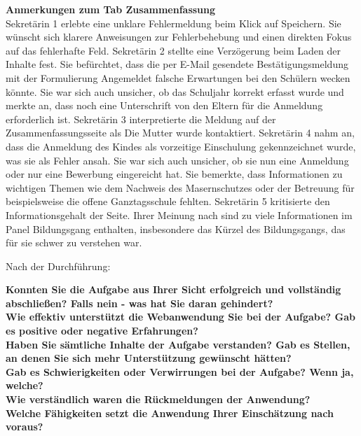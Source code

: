 \textbf{Anmerkungen zum Tab \glqq Zusammenfassung\grqq{}}\\
Sekretärin 1 erlebte eine unklare Fehlermeldung beim Klick auf \glqq Speichern\grqq{}. Sie wünscht sich klarere Anweisungen zur Fehlerbehebung und einen direkten Fokus auf das fehlerhafte Feld.
Sekretärin 2 stellte eine Verzögerung beim Laden der Inhalte fest. Sie befürchtet, dass die per E-Mail gesendete Bestätigungsmeldung mit der Formulierung \glqq Angemeldet\grqq{} falsche Erwartungen bei den Schülern wecken könnte. Sie war sich auch unsicher, ob das Schuljahr korrekt erfasst wurde und merkte an, dass noch eine Unterschrift von den Eltern für die Anmeldung erforderlich ist.
Sekretärin 3 interpretierte die Meldung auf der Zusammenfassungsseite als \glqq Die Mutter wurde kontaktiert\grqq{}.
Sekretärin 4 nahm an, dass die Anmeldung des Kindes als \glqq vorzeitige Einschulung\grqq{} gekennzeichnet wurde, was sie als Fehler ansah. Sie war sich auch unsicher, ob sie nun eine \glqq Anmeldung\grqq{} oder nur eine \glqq Bewerbung\grqq{} eingereicht hat. Sie bemerkte, dass Informationen zu wichtigen Themen wie dem Nachweis des Masernschutzes oder der Betreuung für beispielsweise die offene Ganztagsschule fehlten.
Sekretärin 5 kritisierte den Informationsgehalt der Seite. Ihrer Meinung nach sind zu viele Informationen im Panel \glqq Bildungsgang\grqq{} enthalten, insbesondere das Kürzel des Bildungsgangs, das für sie schwer zu verstehen war.



Nach der Durchführung:

\textbf{Konnten Sie die Aufgabe aus Ihrer Sicht erfolgreich und vollständig abschließen? Falls nein - was hat Sie daran gehindert?}\\

\textbf{Wie effektiv unterstützt die Webanwendung Sie bei der Aufgabe?  Gab es positive oder negative Erfahrungen?}\\

\textbf{Haben Sie sämtliche Inhalte der Aufgabe verstanden? Gab es Stellen, an denen Sie sich mehr Unterstützung gewünscht hätten?}\\

\textbf{Gab es Schwierigkeiten oder Verwirrungen bei der Aufgabe? Wenn ja, welche?}\\

\textbf{Wie verständlich waren die Rückmeldungen der Anwendung?}\\

\textbf{Welche Fähigkeiten setzt die Anwendung Ihrer Einschätzung nach voraus?}\\

